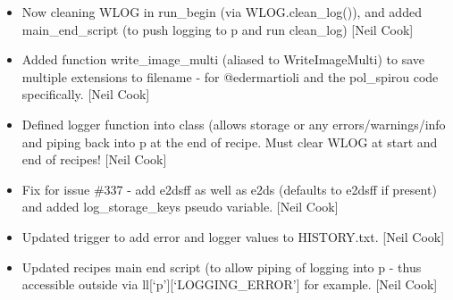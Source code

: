 \documentclass[a4paper,10pt,english]{report}
\begin{document}
\begin{itemize}
\item {} 
Now cleaning WLOG in run\_begin (via WLOG.clean\_log()), and added
main\_end\_script (to push logging to p and run clean\_log) {[}Neil Cook{]}

\item {} 
Added function write\_image\_multi (aliased to WriteImageMulti) to save
multiple extensions to filename - for @edermartioli and the pol\_spirou
code specifically. {[}Neil Cook{]}

\item {} 
Defined logger function into class (allows storage or any
errors/warnings/info and piping back into p at the end of recipe. Must
clear WLOG at start and end of recipes! {[}Neil Cook{]}

\item {} 
Fix for issue \#337 - add e2dsff as well as e2ds (defaults to e2dsff if
present) and added log\_storage\_keys pseudo variable. {[}Neil Cook{]}

\item {} 
Updated trigger to add error and logger values to HISTORY.txt. {[}Neil
Cook{]}

\item {} 
Updated recipes main end script (to allow piping of logging into p -
thus accessible outside via ll{[}‘p’{]}{[}‘LOGGING\_ERROR’{]} for example.
{[}Neil Cook{]}

\end{itemize}
\end{document}

